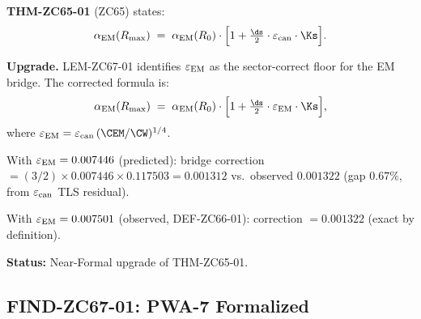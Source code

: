 \documentclass[12pt, a4paper]{article}
\renewcommand{\epsEM}{\varepsilon_{\rm EM}}
\renewcommand{\epscan}{\varepsilon_{\rm can}}
\renewcommand{\aEM}{\alpha_{\rm EM}}
\begin{document}

\begin{formalbox}[title={COR-ZC67-03: THM-ZC65-01 Upgraded ---
  Sector-Correct Floor $\epsEM$ ($R_0/R_{\max}$)}]

\textbf{THM-ZC65-01} (ZC65) states:
\[
  \aEM(R_{\max}) \;=\; \aEM(R_0)\cdot\Bigl[1 + \tfrac{\ds}{2}\cdot\epscan\cdot\Ks\Bigr].
\]

\textbf{Upgrade.}
LEM-ZC67-01 identifies $\epsEM$ as the sector-correct floor
for the EM bridge.
The corrected formula is:
\begin{equation}
  \aEM(R_{\max}) \;=\; \aEM(R_0)\cdot\Bigl[1 + \tfrac{\ds}{2}\cdot\epsEM\cdot\Ks\Bigr],
  \label{eq:alpha-upgraded}
\end{equation}
where $\epsEM = \epscan\,(\CEM/\CW)^{1/4}$.

With $\epsEM = 0.007446$ (predicted): bridge correction
$= (3/2)\times 0.007446\times 0.117503 = 0.001312$
vs.\ observed $0.001322$ (gap $0.67\%$, from $\epscan$ TLS residual).

With $\epsEM = 0.007501$ (observed, DEF-ZC66-01):
correction $= 0.001322$ (exact by definition).

\textbf{Status:} Near-Formal upgrade of THM-ZC65-01.
\end{formalbox}

\subsection{FIND-ZC67-01: PWA-7 Formalized}
\label{sec:find}
\end{document}

